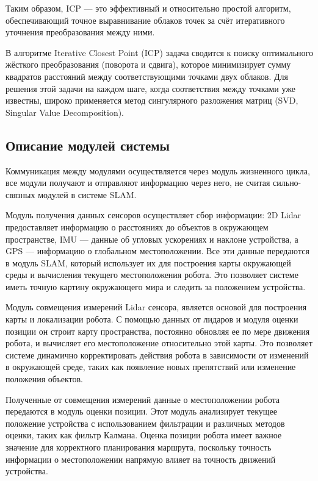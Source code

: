Таким образом, ICP — это эффективный и относительно простой алгоритм, обеспечивающий точное выравнивание облаков точек за счёт итеративного уточнения преобразования между ними.

В алгоритме Iterative Closest Point (ICP) задача сводится к поиску оптимального жёсткого преобразования (поворота и сдвига), которое минимизирует сумму квадратов расстояний между соответствующими точками двух облаков. Для решения этой задачи на каждом шаге, когда соответствия между точками уже известны, широко применяется метод сингулярного разложения матриц (SVD, Singular Value Decomposition).


\subsection{Описание модулей системы}

Коммуникация между модулями осуществляется через модуль жизненного цикла, все
модули получают и отправляют информацию через него, не считая сильно-связных
модулей в системе SLAM. 

Модуль получения данных сенсоров осуществляет сбор информации: 2D Lidar
предоставляет информацию о расстояниях до объектов в окружающем пространстве,
IMU — данные об угловых ускорениях и наклоне устройства, а GPS — информацию о
глобальном местоположении. Все эти данные передаются в модуль SLAM, который
использует их для построения карты окружающей среды и вычисления текущего
местоположения робота. Это позволяет системе иметь точную картину окружающего
мира и следить за положением устройства.

Модуль совмещения измерений Lidar сенсора, является основой для построения карты
и локализации робота. С помощью данных от лидаров и модуля оценки позиции он
строит карту пространства, постоянно обновляя ее по мере движения робота, и
вычисляет его местоположение относительно этой карты. Это позволяет системе
динамично корректировать действия робота в зависимости от изменений в окружающей
среде, таких как появление новых препятствий или изменение положения объектов.

Полученные от совмещения измерений данные о местоположении робота передаются в модуль оценки
позиции. Этот модуль анализирует текущее положение устройства с использованием
фильтрации и различных методов оценки, таких как фильтр Калмана. Оценка позиции
робота имеет важное значение для корректного планирования маршрута, поскольку
точность информации о местоположении напрямую влияет на точность движений
устройства.

